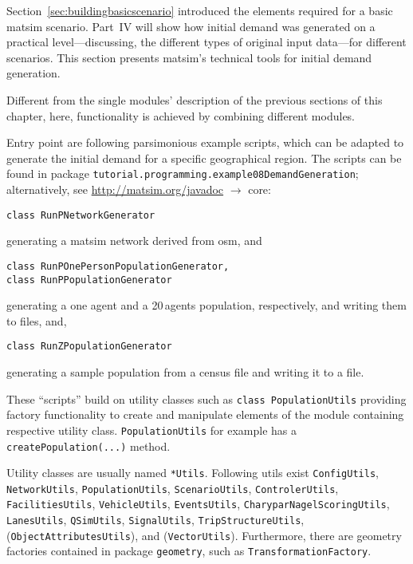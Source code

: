
Section~\ref{sec:buildingbasicscenario} introduced the elements
required for a basic \gls{matsim} scenario.  Part~IV will show how
initial demand was generated on a practical level---discussing, \eg
the different types of original input data---for different scenarios.
This section presents \gls{matsim}'s technical tools for initial
demand generation.


Different from the single modules' description of the previous sections of this chapter, here, functionality is achieved by combining different modules. 

Entry point are following parsimonious example scripts, which can be adapted to generate the initial demand for a specific geographical region. The scripts can be found in package \lstinline|tutorial.programming.example08DemandGeneration|; alternatively, see \url{http://matsim.org/javadoc} $\to$ core:
\begin{lstlisting}
class RunPNetworkGenerator
\end{lstlisting} 
generating a \gls{matsim} network derived from \gls{osm}, and
\begin{lstlisting}
class RunPOnePersonPopulationGenerator, 
class RunPPopulationGenerator
\end{lstlisting}
generating a one agent and a 20\,agents population, respectively, and writing them to files, and, 
\begin{lstlisting}
class RunZPopulationGenerator
\end{lstlisting} 
generating a sample population from a census file and writing it to a file.


These ``scripts'' build on utility classes such as \lstinline|class PopulationUtils| providing factory functionality 
to create and manipulate elements of the module containing respective utility class. \lstinline|PopulationUtils| for example has a \lstinline|createPopulation(...)| method.

Utility classes are usually named \lstinline|*Utils|. 
Following utils exist
\lstinline|ConfigUtils|,
\lstinline|NetworkUtils|,
\lstinline|PopulationUtils|,
\lstinline|ScenarioUtils|,
\lstinline|ControlerUtils|,
\lstinline|FacilitiesUtils|,
\lstinline|VehicleUtils|,
%
\lstinline|EventsUtils|,
\lstinline|CharyparNagelScoringUtils|,
\lstinline|LanesUtils|,
\lstinline|QSimUtils|,
%
\lstinline|SignalUtils|,
\lstinline|TripStructureUtils|,
(\lstinline|ObjectAttributesUtils|), and
(\lstinline|VectorUtils|).
Furthermore, there are geometry factories contained in package \lstinline|geometry|, such as \lstinline|TransformationFactory|.

